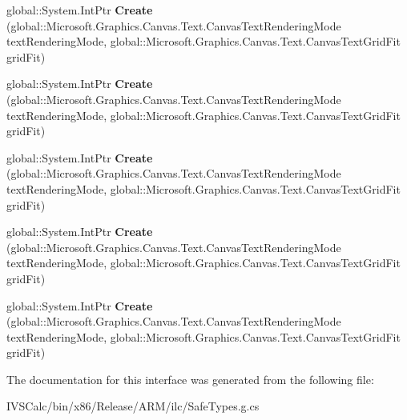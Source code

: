 \begin{DoxyCompactItemize}
\item 
\mbox{\label{interface_microsoft_1_1_graphics_1_1_canvas_1_1_text_1_1_i_canvas_text_rendering_parameters_factory_a7880678035af6fa772acfd906c5a0828}} 
global\+::\+System.\+Int\+Ptr {\bfseries Create} (global\+::\+Microsoft.\+Graphics.\+Canvas.\+Text.\+Canvas\+Text\+Rendering\+Mode text\+Rendering\+Mode, global\+::\+Microsoft.\+Graphics.\+Canvas.\+Text.\+Canvas\+Text\+Grid\+Fit grid\+Fit)
\item 
\mbox{\label{interface_microsoft_1_1_graphics_1_1_canvas_1_1_text_1_1_i_canvas_text_rendering_parameters_factory_a7880678035af6fa772acfd906c5a0828}} 
global\+::\+System.\+Int\+Ptr {\bfseries Create} (global\+::\+Microsoft.\+Graphics.\+Canvas.\+Text.\+Canvas\+Text\+Rendering\+Mode text\+Rendering\+Mode, global\+::\+Microsoft.\+Graphics.\+Canvas.\+Text.\+Canvas\+Text\+Grid\+Fit grid\+Fit)
\item 
\mbox{\label{interface_microsoft_1_1_graphics_1_1_canvas_1_1_text_1_1_i_canvas_text_rendering_parameters_factory_a7880678035af6fa772acfd906c5a0828}} 
global\+::\+System.\+Int\+Ptr {\bfseries Create} (global\+::\+Microsoft.\+Graphics.\+Canvas.\+Text.\+Canvas\+Text\+Rendering\+Mode text\+Rendering\+Mode, global\+::\+Microsoft.\+Graphics.\+Canvas.\+Text.\+Canvas\+Text\+Grid\+Fit grid\+Fit)
\item 
\mbox{\label{interface_microsoft_1_1_graphics_1_1_canvas_1_1_text_1_1_i_canvas_text_rendering_parameters_factory_a7880678035af6fa772acfd906c5a0828}} 
global\+::\+System.\+Int\+Ptr {\bfseries Create} (global\+::\+Microsoft.\+Graphics.\+Canvas.\+Text.\+Canvas\+Text\+Rendering\+Mode text\+Rendering\+Mode, global\+::\+Microsoft.\+Graphics.\+Canvas.\+Text.\+Canvas\+Text\+Grid\+Fit grid\+Fit)
\item 
\mbox{\label{interface_microsoft_1_1_graphics_1_1_canvas_1_1_text_1_1_i_canvas_text_rendering_parameters_factory_a7880678035af6fa772acfd906c5a0828}} 
global\+::\+System.\+Int\+Ptr {\bfseries Create} (global\+::\+Microsoft.\+Graphics.\+Canvas.\+Text.\+Canvas\+Text\+Rendering\+Mode text\+Rendering\+Mode, global\+::\+Microsoft.\+Graphics.\+Canvas.\+Text.\+Canvas\+Text\+Grid\+Fit grid\+Fit)
\end{DoxyCompactItemize}


The documentation for this interface was generated from the following file\+:\begin{DoxyCompactItemize}
\item 
I\+V\+S\+Calc/bin/x86/\+Release/\+A\+R\+M/ilc/Safe\+Types.\+g.\+cs\end{DoxyCompactItemize}
